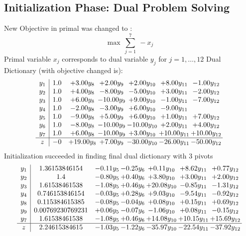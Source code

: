 \documentclass[9pt]{article}
\begin{document}
\subsection{Initialization Phase: Dual Problem Solving}
New Objective in primal was changed to : \[ \max\ \sum_{j=1}^{7}\ - x_j \] 
Primal variable $x_j$ corresponds to dual variable $y_j$ for $j = 1,\ldots,12$
Dual Dictionary (with objective changed is): 
\[\begin{array}{c| c c@{\hskip 2pt} c@{\hskip 2pt} c@{\hskip 2pt} c@{\hskip 2pt} c@{\hskip 2pt} }
 y_{1}   &  1.0 & +  3.00 y_{8} & +  2.00 y_{9} & +  2.00 y_{10} & +  8.00 y_{11} & -1.00 y_{12}\\
 y_{2}   &  1.0 & +  4.00 y_{8} & -8.00 y_{9} & -5.00 y_{10} & +  3.00 y_{11} & -2.00 y_{12}\\
 y_{3}   &  1.0 & +  6.00 y_{8} & -10.00 y_{9} & +  9.00 y_{10} & -1.00 y_{11} & -7.00 y_{12}\\
 y_{4}   &  1.0 & -2.00 y_{8} & -3.00 y_{9} & +  6.00 y_{10} & -9.00 y_{11} &   \\
 y_{5}   &  1.0 & -9.00 y_{8} & +  5.00 y_{9} & +  6.00 y_{10} & +  1.00 y_{11} & +  7.00 y_{12}\\
 y_{6}   &  1.0 & -8.00 y_{8} & -10.00 y_{9} & -10.00 y_{10} & +  2.00 y_{11} & +  4.00 y_{12}\\
 y_{7}   &  1.0 & +  6.00 y_{8} & -10.00 y_{9} & +  3.00 y_{10} & + 10.00 y_{11} & + 10.00 y_{12}\\
\hline
z    &  -0 & + 19.00 y_{8} & +  7.00 y_{9} & -30.00 y_{10} & -26.00 y_{11} & -50.00 y_{12}\\
\end{array}\]
Initialization succeeded in finding final dual dictionary with 3 pivots
\[\begin{array}{c| c c@{\hskip 2pt} c@{\hskip 2pt} c@{\hskip 2pt} c@{\hskip 2pt} c@{\hskip 2pt} }
 y_{1}   &  1.36153846154 & -0.11 y_{5} & -0.25 y_{6} & +  0.11 y_{10} & +  8.62 y_{11} & +  0.77 y_{12}\\
 y_{2}   &  1.4 & -0.80 y_{5} & +  0.40 y_{6} & +  3.80 y_{10} & +  3.00 y_{11} & +  2.00 y_{12}\\
 y_{3}   &  1.61538461538 & -1.08 y_{5} & +  0.46 y_{6} & + 20.08 y_{10} & -0.85 y_{11} & -1.31 y_{12}\\
 y_{4}   &  0.746153846154 & -0.03 y_{5} & +  0.28 y_{6} & +  9.03 y_{10} & -9.54 y_{11} & -0.92 y_{12}\\
 y_{8}   &  0.115384615385 & -0.08 y_{5} & -0.04 y_{6} & +  0.08 y_{10} & +  0.15 y_{11} & +  0.69 y_{12}\\
 y_{9}   &  0.00769230769231 & +  0.06 y_{5} & -0.07 y_{6} & -1.06 y_{10} & +  0.08 y_{11} & -0.15 y_{12}\\
 y_{7}   &  1.61538461538 & -1.08 y_{5} & +  0.46 y_{6} & + 14.08 y_{10} & + 10.15 y_{11} & + 15.69 y_{12}\\
\hline
z    &  2.24615384615 & -1.03 y_{5} & -1.22 y_{6} & -35.97 y_{10} & -22.54 y_{11} & -37.92 y_{12}\\
\end{array}\]
\end{document}
